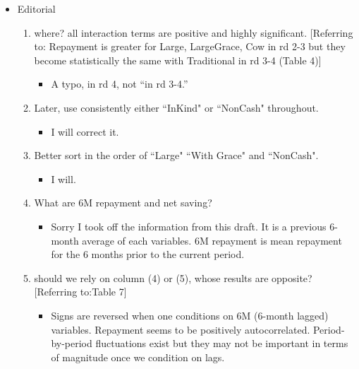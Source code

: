 \begin{itemize}
\item	Editorial
\begin{enumerate}
\vspace{1.0ex}\setlength{\itemsep}{1.0ex}\setlength{\baselineskip}{12pt}
\item	where? all interaction terms are positive and highly significant. [Referring to: Repayment is greater for \textsf{Large, LargeGrace, Cow} in rd 2-3 but they become statistically the same with \textsf{Traditional} in rd 3-4  (Table 4)]
	\begin{itemize}
	\vspace{1.0ex}\setlength{\itemsep}{1.0ex}\setlength{\baselineskip}{12pt}
	\item	A typo, in rd 4, not ``in rd 3-4.''
	\end{itemize}
\item	Later, use consistently either ``InKind" or ``NonCash" throughout. 
	\begin{itemize}
	\vspace{1.0ex}\setlength{\itemsep}{1.0ex}\setlength{\baselineskip}{12pt}
	\item	I will correct it.
	\end{itemize}
\item	Better sort in the order of ``Large" ``With Grace" and ``NonCash". 
	\begin{itemize}
	\vspace{1.0ex}\setlength{\itemsep}{1.0ex}\setlength{\baselineskip}{12pt}
	\item	I will.
	\end{itemize}
\item	What are 6M repayment and net saving?
	\begin{itemize}
	\vspace{1.0ex}\setlength{\itemsep}{1.0ex}\setlength{\baselineskip}{12pt}
	\item	Sorry I took off the information from this draft. It is a previous 6-month average of each variables. 6M repayment is mean repayment for the 6 months prior to the current period.
	\end{itemize}
\item	should we rely on column (4) or (5), whose results are opposite? [Referring to:Table 7]
	\begin{itemize}
	\vspace{1.0ex}\setlength{\itemsep}{1.0ex}\setlength{\baselineskip}{12pt}
	\item	Signs are reversed when one conditions on 6M (6-month lagged) variables. Repayment seems to be positively autocorrelated. Period-by-period fluctuations exist but they may not be important in terms of magnitude once we condition on lags.

\end{itemize}
\end{enumerate}
\end{itemize}
